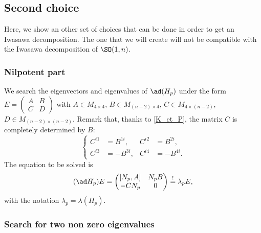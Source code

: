 					\subsection{Second choice}
\label{SubSecANbarIwa}

Here, we show an other set of choices that can be done in order to get an Iwasawa decomposition. The one that we will create will not be compatible with the Iwasawa decomposition of $\SO(1,n)$.

					\subsubsection{Nilpotent part}

We search the eigenvectors and eigenvalues of $\ad(H_p)$ under the form $E=\begin{pmatrix}A&B\\C&D\end{pmatrix}$ with $A\in M_{4\times 4}$, $B\in M_{(n-2)\times 4}$, $C\in M_{4\times (n-2)}$, $D\in M_{(n-2)\times (n-2)}$.  Remark that, thanks to \eqref{K_et_P}, the matrix $C$ is completely determined by $B$: 
\begin{equation}\label{C_de_B}
\left\{\begin{aligned}C^{i1}&=B^{1i},&C^{i2}&=B^{2i},\\
                    C^{i3}&=-B^{3i},&C^{i4}&=-B^{4i}.\end{aligned}\right.
\end{equation}
The equation to be solved is
\begin{equation}                                                                        \label{eq_gene}
(\ad H_p)E=\begin{pmatrix}[N_p,A]&N_pB\\-CN_p&0\end{pmatrix}\stackrel{!}{=}\lambda_pE,
\end{equation}
with the notation $\lambda_p=\lambda(H_p)$.


\subsubsection{Search for two non zero eigenvalues}

